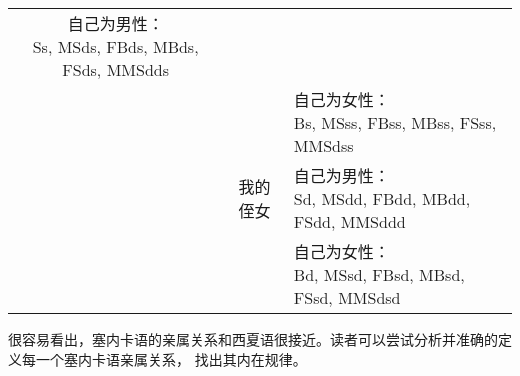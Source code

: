 \begin{center}
\begin{tabular}{|c|c|p{10cm}|}
\parbox[t]{10cm}{自己为男性：\\Ss, MSds, FBds, MBds, FSds, MMSdds} \\
 & &
\parbox[t]{10cm}{自己为女性：\\Bs, MSss, FBss, MBss, FSss, MMSdss} \\ \hline
{} & 我的侄女 & 
\parbox[t]{10cm}{自己为男性：\\Sd, MSdd, FBdd, MBdd, FSdd, MMSddd} \\
 & &
\parbox[t]{10cm}{自己为女性：\\Bd, MSsd, FBsd, MBsd, FSsd, MMSdsd} \\ \hline
\end{tabular}
\end{center}

很容易看出，塞内卡语的亲属关系和西夏语很接近。读者可以尝试分析并准确的定义每一个塞内卡语亲属关系，
找出其内在规律。